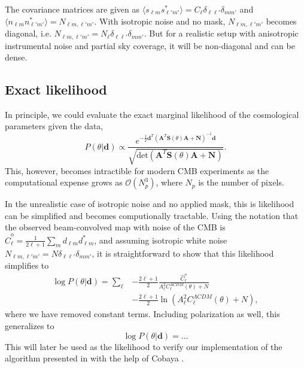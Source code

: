 \documentclass[twocolumn]{../common/aa}
\begin{document}
The covariance matrices are given as $\langle s_{\ell m}s_{\ell' m'}^* \rangle = C_{\ell} \delta_{\ell \ell'}\delta_{mm'}$ and $\langle n_{\ell m}n_{\ell' m'}^* \rangle = N_{\ell m, \ell' m'}$. With isotropic noise and no mask, $N_{\ell m, \ell' m'} $ becomes diagonal, i.e. $N_{\ell m, \ell' m'} = N_\ell \delta_{\ell \ell'}\delta_{mm'}$. But for a realistic setup with anisotropic instrumental noise and partial sky coverage, it will be non-diagonal and can be dense.

\subsection{Exact likelihood}
\label{sec:exact-likelihood}

In principle, we could evaluate the exact marginal likelihood of the cosmological parameters given the data, 
\begin{equation}
    P(\theta | \textbf{d}) \propto \frac{e^{-\frac12 \textbf{d}^T (\textbf{A}^T \textbf{S}(\theta) \textbf{A} + \textbf{N})^{-1}\textbf{d}}}{\sqrt{\text{det}\left(\textbf{A}^T \textbf{S}(\theta) \textbf{A} + \textbf{N}\right)}}.
\end{equation}
This, however, becomes intractible for modern CMB experiments as the computational expense grows as $\mathcal{O}(N_p^3)$, where $N_p$ is the number of pixels.

In the unrealistic case of isotropic noise and no applied mask, this is likelihood can be simplified and becomes computionally tractable. Using the notation that the observed beam-convolved map with noise of the CMB is $\hat{C}^{\mathrm{o}}_{\ell} = \frac{1}{2\ell+1}\sum_m d_{\ell m}d^*_{\ell m}$, and assuming isotropic white noise $N_{\ell m, \ell'm'} = N \delta_{\ell \ell'}\delta_{mm'}$, it is straightforward to show that this likelihood simplifies to
\begin{align}
    \nonumber
    \log P(\theta | \textbf{d}) = \sum_{\ell} &-\frac{2\ell+1}{2} \frac{\hat{C}^{\mathrm{o}}_{\ell}}{A_\ell^2 C^{\Lambda CDM}_{\ell}(\theta) + N}\\
    & -\frac{2\ell+1}{2} \ln \left(A_\ell^2 C^{\Lambda CDM}_{\ell}(\theta) + N \right),
\end{align}
where we have removed constant terms. Including polarization as well, this generalizes to
\begin{equation}
    \log P(\theta | \textbf{d}) = ...
\end{equation}
This will later be used as the likelihood to verify our implementation of the algorithm presented in \cite{racine:2016} with the help of Cobaya \cite{cite-cobaya}.
\end{document}
